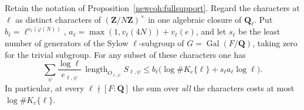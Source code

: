 \begin{corollary}
\label{newcoh:tamepool}
Retain the notation of Proposition~\ref{newcoh:fullsupport}. Regard
the characters at \(\ell\) as distinct characters of
\((\mathbf Z/N\mathbf Z)^\times\) in one algebraic closure of
\(\mathbf Q_\ell\). Put \(b_\ell=\ell^{v_\ell(\varphi(N))}\),
\(a_\ell=\max(1,v_\ell(4N))+v_\ell(e)\), and let \(s_\ell\)
be the least number of generators of the Sylow \(\ell\)-subgroup of
\(G=\operatorname{Gal}(F/\mathbf Q)\), taking zero for the trivial
subgroup. For any subset of these characters one has
\[
 \sum_{\psi}
  \frac{\log\ell}{e_{\ell,\psi}}\,
     \operatorname{length}_{O_{\ell,\psi}} S_{\ell,\psi}
 \le b_\ell\bigl(\log\#K_e\{\ell\}
                     +s_\ell a_\ell\log\ell\bigr).
\]
In particular, at every \(\ell\nmid [F:\mathbf Q]\) the sum over
\emph{all} the characters costs at most \(\log\#K_e\{\ell\}\).
\end{corollary}
